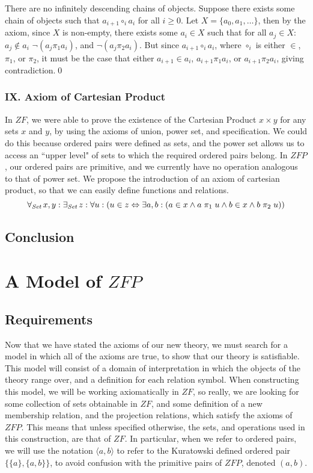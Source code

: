 \documentclass[11pt]{report}
\newcommand{\all}[1]{\forall_{\mathit{#1}}\hspace{0.5mm}}
\newcommand{\ex}[1]{\exists_{\mathit{#1}}\hspace{0.5mm}}
\newcommand{\pleft}{\mathrel{\pi_1}}
\newcommand{\pright}{\mathrel{\pi_2}}
\newcommand{\pair}[2]{\langle #1,#2 \rangle}
\theoremstyle{definition}
\theoremstyle{theorem}
\theoremstyle{lemma}
\begin{document}
\theorem There are no infinitely descending chains of objects.
\proof Suppose there exists some chain of objects such that $a_{i+1} \mathrel{\circ_i} a_i$ for all $i\geq 0$. Let $X = \{a_0, a_1, \ldots\}$, then by the axiom, since $X$ is non-empty, there exists some $a_i \in X$ such that for all $a_j\in X$: $a_j \notin a_i$ $\neg(a_j\pleft a_i)$, and $\neg (a_j\pright a_i)$.
But since $a_{i+1} \mathrel{\circ_i} a_i$,
where $\mathrel{\circ_i}$ is either $\in$, $\pleft$, or $\pright$, it must be the case that either $a_{i+1} \in a_i$, $a_{i+1}\pleft a_i$, or $a_{i+1}\pright a_i$, giving contradiction.\qed

\subsubsection*{IX. Axiom of Cartesian Product}
In $\mathit{ZF}$, we were able to prove the existence of the Cartesian Product $x \times y$ for any sets $x$ and $y$, by using the axioms of union, power set, and specification.
We could do this because ordered pairs were defined as sets, and the power set allows us to access an ``upper level" of sets to which the required ordered pairs belong.
In $\mathit{ZFP}$, our ordered pairs are primitive, and we currently have no operation analogous to that of power set.
We propose the introduction of an axiom of cartesian product, so that we can easily define functions and relations.
$$\all{Set} x,y: \ex{Set} z:
 \forall u: (u \in z \Leftrightarrow
 \exists a,b: (a \in x \wedge a\pleft u \wedge b\in x \wedge b\pright u))$$

\subsection{Conclusion}

\section{A Model of $\mathit{ZFP}$}
\subsection{Requirements}

Now that we have stated the axioms of our new theory, we must search for a model in which all of the axioms are true, to show that our theory is satisfiable.
This model will consist of a domain of interpretation in which the objects of the theory range over, and a definition for each relation symbol.
When constructing this model, we will be working axiomatically in $\mathit{ZF}$, so really, we are looking for some collection of sets obtainable in $\mathit{ZF}$, and some definition of a new membership relation, and the projection relations, which satisfy the axioms of $\mathit{ZFP}$.
This means that unless specified otherwise, the sets, and operations used in this construction, are that of $\mathit{ZF}$.
In particular, when we refer to ordered pairs, we will use the notation $\pair{a}{b}$ to refer to the Kuratowski defined ordered pair $\{\{a\}, \{a,b\}\}$, to avoid confusion with the primitive pairs of $\mathit{ZFP}$, denoted $(a,b)$.
\end{document}
